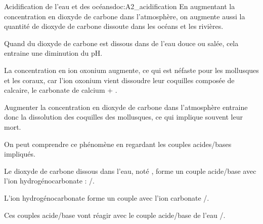 \begin{doc}{Acidification de l'eau et des océans}{doc:A2_acidification}
  En augmentant la concentration en dioxyde de carbone dans l'atmosphère, on augmente aussi la quantité de dioxyde de carbone dissoute dans les océans et les rivières.
  
  \begin{encart}  
    Quand du dioxyde de carbone est dissous dans de l'eau douce ou salée, cela entraine une diminution du pH.
  \end{encart}
  La concentration en ion oxonium \oxonium augmente, ce qui est néfaste pour les mollusques et les coraux, car l'ion oxonium vient dissoudre leur coquilles composée de calcaire, le carbonate de calcium  + .

  \begin{encart}
    Augmenter la concentration en dioxyde de carbone dans l'atmosphère entraine donc la dissolution des coquilles des mollusques, ce qui implique souvent leur mort.
  \end{encart}

  On peut comprendre ce phénomène en regardant les couples acides/bases impliqués.
  \begin{listePoints}
    \item Le dioxyde de carbone dissous dans l'eau, noté , forme un couple acide/base avec l'ion hydrogénocarbonate : /.
    \item L'ion hydrogénocarbonate forme un couple avec l'ion carbonate /.
    \item Ces couples acide/base vont réagir avec le couple acide/base de l'eau \oxonium/\eau.
  \end{listePoints}
\end{doc}





